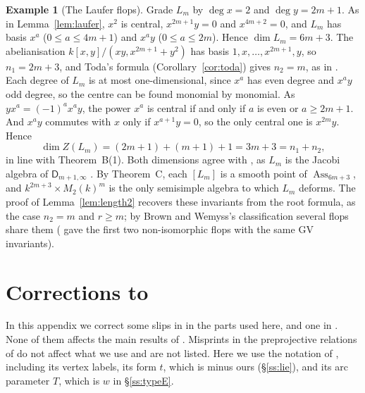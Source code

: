 \documentclass[11pt]{amsart}
\numberwithin{table}{section}
\numberwithin{figure}{section}
\numberwithin{equation}{section}
\theoremstyle{definition}
\newtheorem{ex}[thm]{Example}
\theoremstyle{plain}
\DeclareMathOperator{\Ass}{Ass}
\begin{document}
\begin{ex}[The Laufer flops]\label{ex:laufer}
Grade $L_m$ by $\deg x = 2$ and $\deg y = 2m + 1$. As in Lemma~\ref{lem:laufer}, $x^2$ is central, $x^{2m+1}y = 0$ and $x^{4m+2} = 0$, and $L_m$ has basis $x^a$ ($0 \le a \le 4m + 1$) and $x^a y$ ($0 \le a \le 2m$). Hence $\dim L_m = 6m + 3$. The abelianisation $k[x,y]/(xy, x^{2m+1} + y^2)$ has basis $1, x, \dots, x^{2m+1}, y$, so $n_1 = 2m + 3$, and Toda's formula (Corollary~\ref{cor:toda}) gives $n_2 = m$, as in \cite[Example~1.3]{T}. Each degree of $L_m$ is at most one-dimensional, since $x^a$ has even degree and $x^a y$ odd degree, so the centre can be found monomial by monomial. As $yx^a = (-1)^a x^a y$, the power $x^a$ is central if and only if $a$ is even or $a \ge 2m + 1$. And $x^a y$ commutes with $x$ only if $x^{a+1}y = 0$, so the only central one is $x^{2m}y$. Hence
\[
\dim Z(L_m) = (2m+1) + (m+1) + 1 = 3m + 3 = n_1 + n_2 ,
\]
in line with Theorem~B(1). Both dimensions agree with \cite[Prop~3.3]{JS}, as $L_m$ is the Jacobi algebra of $\mathsf{D}_{m+1,\infty}$ \cite[Table~1]{BW}. By Theorem~C, each $[L_m]$ is a smooth point of $\Ass_{6m+3}$, and $k^{2m+3} \times M_2(k)^m$ is the only semisimple algebra to which $L_m$ deforms. The proof of Lemma~\ref{lem:length2} recovers these invariants from the root formula, as the case $n_2 = m$ and $r \ge m$; by Brown and Wemyss's classification \cite[Cor~8.13]{BW} several flops share them (\cite{BW18} gave the first two non-isomorphic flops with the same GV invariants).
\end{ex}

%
\appendix

\section{Corrections to \texorpdfstring{\cite{K}}{[K]}}\label{app:corrections}

In this appendix we correct some slips in \cite{K} in the parts used here, and one in \cite[Remark~4.14]{K}. None of them affects the main results of \cite{K}. Misprints in the preprojective relations of \cite[Examples~4.6, 4.7, 4.18--4.20]{K} do not affect what we use and are not listed. Here we use the notation of \cite{K}, including its vertex labels, its form $t$, which is minus ours (\S\ref{ss:lie}), and its arc parameter $T$, which is $w$ in \S\ref{ss:typeE}.
\end{document}
